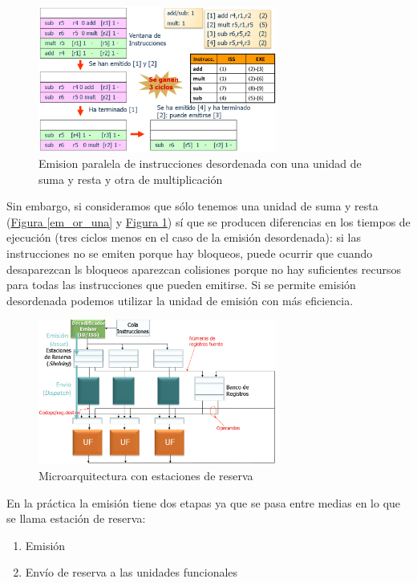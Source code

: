 \documentclass[10pt,a4paper,spanish]{report}
\begin{document}
\begin{figure}[!h]
\centering
\includegraphics[width=0.7\textwidth]{89}
\caption{Emision paralela de instrucciones desordenada con una unidad de suma y resta y otra de multiplicación}
\label{em_dor_una}
\end{figure}

Sin embargo, si consideramos que sólo tenemos una unidad de suma y resta (\hyperref[em_or_una]{Figura \ref*{em_or_una}} y \hyperref[em_dor_una]{Figura \ref*{em_dor_una}}) sí que se producen diferencias en los tiempos de ejecución (tres ciclos menos en el caso de la emisión desordenada): si las instrucciones no se emiten porque hay bloqueos, puede ocurrir que cuando desaparezcan ls bloqueos aparezcan colisiones porque no hay suficientes recursos para todas las instrucciones que pueden emitirse. Si se permite emisión desordenada podemos utilizar la unidad de emisión con más eficiencia.

\begin{figure}[!h]
\centering
\includegraphics[width=0.7\textwidth]{90}
\caption{Microarquitectura con estaciones de reserva}
\label{estaciones_reserva}
\end{figure}

En la práctica la emisión tiene dos etapas ya que se pasa entre medias en lo que se llama estación de reserva:
\begin{enumerate}[\color{azul}{$\heartsuit$}]
    \item Emisión
    \item Envío de reserva a las unidades funcionales
\end{enumerate}
\end{document}
